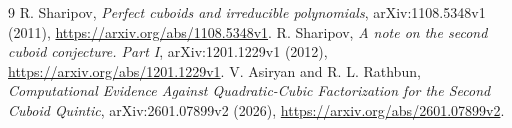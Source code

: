 \documentclass[11pt]{article}
\begin{document}
\begin{thebibliography}{9}
R. Sharipov, \emph{Perfect cuboids and irreducible polynomials},
arXiv:1108.5348v1 (2011),
\url{https://arxiv.org/abs/1108.5348v1}.
R. Sharipov, \emph{A note on the second cuboid conjecture. Part I},
arXiv:1201.1229v1 (2012),
\url{https://arxiv.org/abs/1201.1229v1}.
V. Asiryan and R. L. Rathbun,
\emph{Computational Evidence Against Quadratic-Cubic Factorization for the
Second Cuboid Quintic}, arXiv:2601.07899v2 (2026),
\url{https://arxiv.org/abs/2601.07899v2}.
\end{thebibliography}
\end{document}
